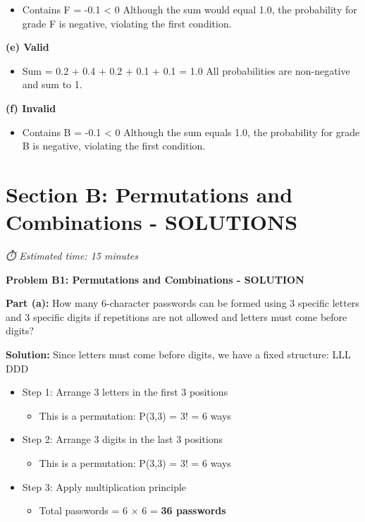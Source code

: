 \documentclass[
  11pt,
]{article}
\providecommand{\tightlist}{%
  \setlength{\itemsep}{0pt}\setlength{\parskip}{0pt}}\usepackage{longtable,booktabs,array}
\begin{document}
\begin{itemize}
\tightlist
\item
  Contains F = -0.1 \textless{} 0 Although the sum would equal 1.0, the
  probability for grade F is negative, violating the first condition.
\end{itemize}

\textbf{(e) Valid}

\begin{itemize}
\tightlist
\item
  Sum = 0.2 + 0.4 + 0.2 + 0.1 + 0.1 = 1.0 All probabilities are
  non-negative and sum to 1.
\end{itemize}

\textbf{(f) Invalid}

\begin{itemize}
\tightlist
\item
  Contains B = -0.1 \textless{} 0 Although the sum equals 1.0, the
  probability for grade B is negative, violating the first condition.
\end{itemize}

\section{Section B: Permutations and Combinations -
SOLUTIONS}\label{section-b-permutations-and-combinations---solutions}

\emph{⏱️ Estimated time: 15 minutes}

\textbf{Problem B1: Permutations and Combinations - SOLUTION}

\textbf{Part (a):} How many 6-character passwords can be formed using 3
specific letters and 3 specific digits if repetitions are not allowed
and letters must come before digits?

\textbf{Solution:} Since letters must come before digits, we have a
fixed structure: LLL DDD

\begin{itemize}
\tightlist
\item
  Step 1: Arrange 3 letters in the first 3 positions

  \begin{itemize}
  \tightlist
  \item
    This is a permutation: P(3,3) = 3! = 6 ways
  \end{itemize}
\item
  Step 2: Arrange 3 digits in the last 3 positions

  \begin{itemize}
  \tightlist
  \item
    This is a permutation: P(3,3) = 3! = 6 ways
  \end{itemize}
\item
  Step 3: Apply multiplication principle

  \begin{itemize}
  \tightlist
  \item
    Total passwords = 6 × 6 = \textbf{36 passwords}
  \end{itemize}
\end{itemize}
\end{document}
